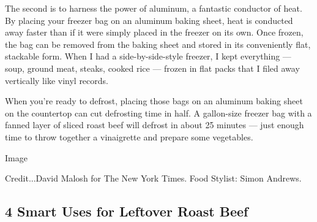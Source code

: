 The second is to harness the power of aluminum, a fantastic conductor of
heat. By placing your freezer bag on an aluminum baking sheet, heat is
conducted away faster than if it were simply placed in the freezer on
its own. Once frozen, the bag can be removed from the baking sheet and
stored in its conveniently flat, stackable form. When I had a
side-by-side-style freezer, I kept everything --- soup, ground meat,
steaks, cooked rice --- frozen in flat packs that I filed away
vertically like vinyl records.

When you're ready to defrost, placing those bags on an aluminum baking
sheet on the countertop can cut defrosting time in half. A gallon-size
freezer bag with a fanned layer of sliced roast beef will defrost in
about 25 minutes --- just enough time to throw together a vinaigrette
and prepare some vegetables.

Image

Credit...David Malosh for The New York Times. Food Stylist: Simon
Andrews.

\hypertarget{4-smart-uses-for-leftover-roast-beef}{%
\subsection{4 Smart Uses for Leftover Roast
Beef}\label{4-smart-uses-for-leftover-roast-beef}}

